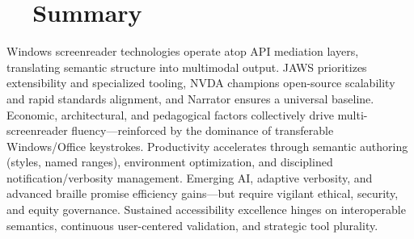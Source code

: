 \section{~~Summary}
\label{sec:sr25-summary}
Windows screenreader technologies operate atop API mediation layers, translating semantic structure into multimodal output. JAWS prioritizes extensibility and specialized tooling, NVDA champions open-source scalability and rapid standards alignment, and Narrator ensures a universal baseline. Economic, architectural, and pedagogical factors collectively drive multi-screenreader fluency—reinforced by the dominance of transferable Windows/Office keystrokes. Productivity accelerates through semantic authoring (styles, named ranges), environment optimization, and disciplined notification/verbosity management. Emerging AI, adaptive verbosity, and advanced braille  promise efficiency gains—but require vigilant ethical, security, and equity governance. Sustained accessibility excellence hinges on interoperable semantics, continuous user-centered validation, and strategic tool plurality.

